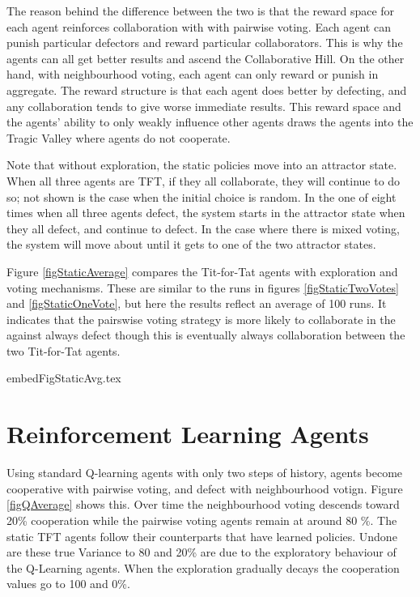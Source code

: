 \documentclass[]{llncs} %
\begin{document}
The reason behind the difference between the two is that the reward space for
each agent reinforces collaboration with with pairwise voting.  Each agent can
punish particular defectors and reward particular collaborators.  This
is why the agents can all get better results and ascend the
Collaborative Hill.  On the other hand, with neighbourhood voting,
each agent can only reward or punish in aggregate.  The reward structure is
that each agent does better by defecting, and any collaboration tends to
give worse immediate results.  This reward space and the agents' ability
to only weakly influence other agents draws the agents into the Tragic
Valley where agents do not cooperate.

Note that without exploration, the static policies move into an attractor
state.  When all three agents are TFT, if they all collaborate, they
will continue to do so;  not shown is the case when the initial choice
is random.  In the one of eight times when all three agents defect, the
system starts in the attractor state when they all defect, and continue
to defect.  In the case where there is mixed voting, the system will move
about until it gets to one of the two attractor states.

Figure \ref {figStaticAverage} compares the Tit-for-Tat agents with
exploration and voting mechanisms.  These are similar to the runs in
figures \ref {figStaticTwoVotes} and \ref {figStaticOneVote}, but
here the results reflect an average of 100 runs.  It indicates that
the pairswise voting strategy is more likely to collaborate in the
against always defect though this is eventually always collaboration
between the two Tit-for-Tat agents.

 {embedFigStaticAvg.tex}

\section {Reinforcement Learning Agents}
\label{sec:qLearning}

Using standard Q-learning agents with only two steps of history,
agents become cooperative with pairwise voting, and defect with
neighbourhood votign.  Figure \ref {figQAverage} shows this.  Over
time the neighbourhood voting descends toward 20\% cooperation while
the pairwise voting agents remain at around 80 \%.  The static TFT
agents follow their counterparts that have learned policies.  Undone
are these true Variance to 80 and 20\% are due to the exploratory
behaviour of the Q-Learning agents.  When the exploration gradually
decays the cooperation values go to 100 and 0\%.
\end{document}
